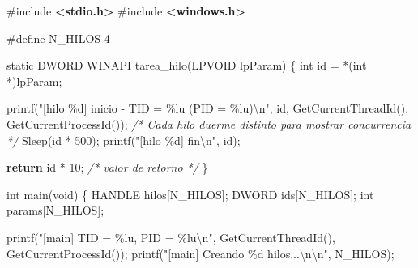 \documentclass[
  spanish,
]{article}
\newenvironment{Shaded}{}{}
\newcommand{\CommentTok}[1]{\textcolor[rgb]{0.38,0.63,0.69}{\textit{#1}}}
\newcommand{\ControlFlowTok}[1]{\textcolor[rgb]{0.00,0.44,0.13}{\textbf{#1}}}
\newcommand{\DataTypeTok}[1]{\textcolor[rgb]{0.56,0.13,0.00}{#1}}
\newcommand{\DecValTok}[1]{\textcolor[rgb]{0.25,0.63,0.44}{#1}}
\newcommand{\ImportTok}[1]{\textcolor[rgb]{0.00,0.50,0.00}{\textbf{#1}}}
\newcommand{\NormalTok}[1]{#1}
\newcommand{\OperatorTok}[1]{\textcolor[rgb]{0.40,0.40,0.40}{#1}}
\newcommand{\PreprocessorTok}[1]{\textcolor[rgb]{0.74,0.48,0.00}{#1}}
\newcommand{\SpecialCharTok}[1]{\textcolor[rgb]{0.25,0.44,0.63}{#1}}
\newcommand{\StringTok}[1]{\textcolor[rgb]{0.25,0.44,0.63}{#1}}
\begin{document}
\begin{Shaded}
\begin{Highlighting}[]
\PreprocessorTok{\#include }\ImportTok{\textless{}stdio.h\textgreater{}}
\PreprocessorTok{\#include }\ImportTok{\textless{}windows.h\textgreater{}}

\PreprocessorTok{\#define N\_HILOS }\DecValTok{4}

\DataTypeTok{static}\NormalTok{ DWORD WINAPI tarea\_hilo}\OperatorTok{(}\NormalTok{LPVOID lpParam}\OperatorTok{)} \OperatorTok{\{}
    \DataTypeTok{int}\NormalTok{ id }\OperatorTok{=} \OperatorTok{*(}\DataTypeTok{int} \OperatorTok{*)}\NormalTok{lpParam}\OperatorTok{;}

\NormalTok{    printf}\OperatorTok{(}\StringTok{"[hilo }\SpecialCharTok{\%d}\StringTok{] inicio {-} TID = }\SpecialCharTok{\%lu}\StringTok{ (PID = }\SpecialCharTok{\%lu}\StringTok{)}\SpecialCharTok{\textbackslash{}n}\StringTok{"}\OperatorTok{,}
\NormalTok{           id}\OperatorTok{,}\NormalTok{ GetCurrentThreadId}\OperatorTok{(),}\NormalTok{ GetCurrentProcessId}\OperatorTok{());}
    \CommentTok{/* Cada hilo duerme distinto para mostrar concurrencia */}
\NormalTok{    Sleep}\OperatorTok{(}\NormalTok{id }\OperatorTok{*} \DecValTok{500}\OperatorTok{);}
\NormalTok{    printf}\OperatorTok{(}\StringTok{"[hilo }\SpecialCharTok{\%d}\StringTok{] fin}\SpecialCharTok{\textbackslash{}n}\StringTok{"}\OperatorTok{,}\NormalTok{ id}\OperatorTok{);}

    \ControlFlowTok{return}\NormalTok{ id }\OperatorTok{*} \DecValTok{10}\OperatorTok{;}  \CommentTok{/* valor de retorno */}
\OperatorTok{\}}

\DataTypeTok{int}\NormalTok{ main}\OperatorTok{(}\DataTypeTok{void}\OperatorTok{)} \OperatorTok{\{}
\NormalTok{    HANDLE hilos}\OperatorTok{[}\NormalTok{N\_HILOS}\OperatorTok{];}
\NormalTok{    DWORD ids}\OperatorTok{[}\NormalTok{N\_HILOS}\OperatorTok{];}
    \DataTypeTok{int}\NormalTok{ params}\OperatorTok{[}\NormalTok{N\_HILOS}\OperatorTok{];}

\NormalTok{    printf}\OperatorTok{(}\StringTok{"[main] TID = }\SpecialCharTok{\%lu}\StringTok{, PID = }\SpecialCharTok{\%lu\textbackslash{}n}\StringTok{"}\OperatorTok{,}
\NormalTok{           GetCurrentThreadId}\OperatorTok{(),}\NormalTok{ GetCurrentProcessId}\OperatorTok{());}
\NormalTok{    printf}\OperatorTok{(}\StringTok{"[main] Creando }\SpecialCharTok{\%d}\StringTok{ hilos...}\SpecialCharTok{\textbackslash{}n\textbackslash{}n}\StringTok{"}\OperatorTok{,}\NormalTok{ N\_HILOS}\OperatorTok{);}


\end{Highlighting}
\end{Shaded}
\end{document}
